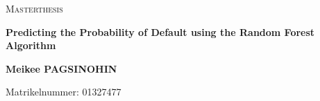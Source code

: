 \documentclass[11pt,twoside=true]{scrreprt}
\begin{document}

\begin{titlepage}
	\centering
	\vspace{1cm}
	{\scshape\LARGE Masterthesis \par}
	\vspace{1cm}
	{\scshape\Large \par}
	\vspace{1.5cm}
	{\huge\bfseries Predicting the Probability of Default using the Random Forest Algorithm \par}
	\vspace{2cm}
	\vspace{2cm}
	\vspace{2cm}
	{\Large\bfseries Meikee PAGSINOHIN \par}	
	\vfill
	{\Large Matrikelnummer: 01327477 \par}

	\vfill

\end{titlepage}


\printacronyms

{} 
\pagestyle{scrheadings} 

\tableofcontents





















\newpage

\end{document}
